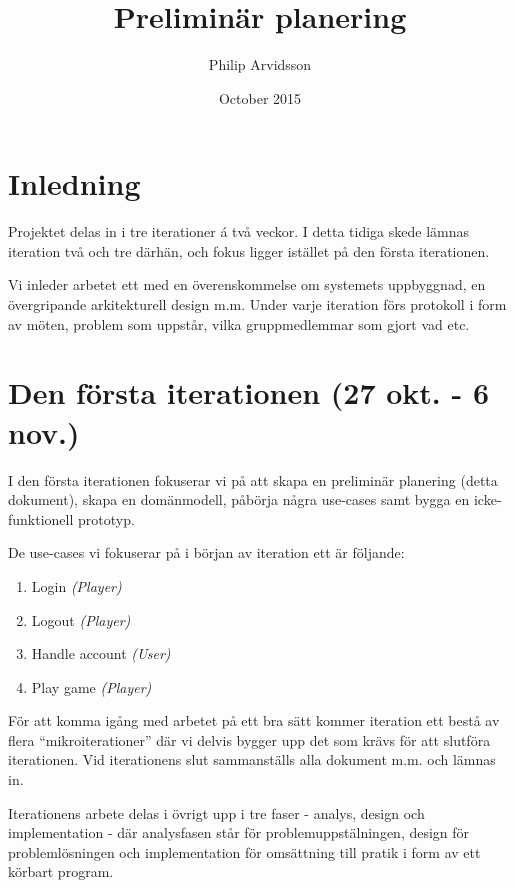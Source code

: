 \documentclass[a4paper]{article}
\title{Preliminär planering}
\author{Philip Arvidsson}
\date{October 2015}
\begin{document}
    \maketitle

    \section{Inledning}
    Projektet delas in i tre iterationer á två veckor. I detta tidiga skede
    lämnas iteration två och tre därhän, och fokus ligger istället på den
    första iterationen.

    Vi inleder arbetet ett med en överenskommelse om systemets uppbyggnad,
    en övergripande arkitekturell design m.m. Under varje iteration förs
    protokoll i form av möten, problem som uppstår, vilka gruppmedlemmar som
    gjort vad etc.

    \section{Den första iterationen (27 okt. - 6 nov.)}

    I den första iterationen fokuserar vi på att skapa en preliminär planering
    (detta dokument), skapa en domänmodell, påbörja några use-cases samt bygga
    en icke-funktionell prototyp.

    De use-cases vi fokuserar på i början av iteration ett är följande:

    \begin{enumerate}
        \item Login \textit{(Player)}
        \item Logout \textit{(Player)}
        \item Handle account \textit{(User)}
        \item Play game \textit{(Player)}
    \end{enumerate}

    För att komma igång med arbetet på ett bra sätt kommer iteration ett bestå
    av flera ``mikroiterationer'' där vi delvis bygger upp det som krävs för att
    slutföra iterationen. Vid iterationens slut sammanställs alla dokument m.m.
    och lämnas in.

    Iterationens arbete delas i övrigt upp i tre faser - analys, design och
    implementation - där analysfasen står för problemuppstälningen, design för
    problemlösningen och implementation för omsättning till pratik i form av ett
    körbart program.

    \vspace{0.5cm}
\end{document}

